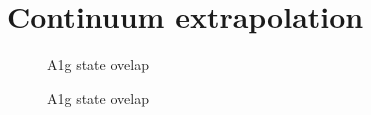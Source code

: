 \section{Continuum extrapolation}\label{sec:continuum}

\begin{figure}[ht!]
\center

\caption{A1g state ovelap\label{fig:a1g-state-overlap}}
\end{figure}


\begin{figure}[ht!]
\center

\caption{A1g state ovelap\label{fig:a1g-state-overlap}}
\end{figure}
